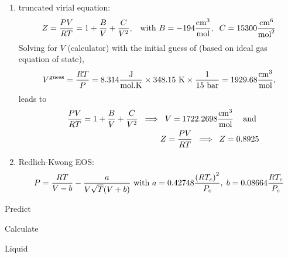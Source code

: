 \begin{probsol}
     \begin{enumerate}[1.]
%
        \item truncated virial equation:
            \begin{displaymath}
               Z =  \displaystyle\frac{PV}{RT}=1+\displaystyle\frac{B}{V}+\displaystyle\frac{C}{V^{2}}, \;\;\;\text{with } B=-194\displaystyle\frac{\text{cm}^{3}}{\text{mol}},\;\;C=15300 \displaystyle\frac{\text{cm}^{6}}{\text{mol}^{2}}
            \end{displaymath}
            Solving for $V$ (calculator) with the initial guess of (based on ideal gas equation of state),
            \begin{displaymath}
               V^{\text{guess}} = \displaystyle\frac{RT}{P} = 8.314 \displaystyle\frac{\text{J}}{\text{mol.K}} \times 348.15\text{ K} \times \displaystyle\frac{1}{15\text{ bar}} = 1929.68 \displaystyle\frac{\text{cm}^{3}}{\text{mol}},
            \end{displaymath}
            leads to
            \begin{eqnarray}
               &&\displaystyle\frac{PV}{RT}=1+\displaystyle\frac{B}{V}+\displaystyle\frac{C}{V^{2}} \;\;\Longrightarrow \;\; V = 1722.2698 \displaystyle\frac{\text{cm}^{3}}{\text{mol}}\;\;\;\text{ and } \nonumber \\
               && Z =  \displaystyle\frac{PV}{RT} \;\;\Longrightarrow \;\; Z = 0.8925 \nonumber
            \end{eqnarray}
%
        \item Redlich-Kwong EOS:
            \begin{displaymath}
               P = \displaystyle\frac{RT}{V-b} - \displaystyle\frac{a}{V\sqrt{T}(V+b)}\text{ with } a = 0.42748\displaystyle\frac{\left(R T_{c}\right)^{2}}{P_{c}},\; b = 0.08664\displaystyle\frac{R T_{c}}{P_{c}}
            \end{displaymath}
%
     \end{enumerate}


  \end{probsol}
%
  \begin{probsol}\label{Chapter:VolumetricPropertiesPureSubstances:Problem:02:solution}
     Predict 
  \end{probsol}
%
  \begin{probsol}\label{Chapter:VolumetricPropertiesPureSubstances:Problem:03:solution}
     Calculate
  \end{probsol}
%
  \begin{probsol}\label{Chapter:VolumetricPropertiesPureSubstances:Problem:04:solution} 
     Liquid 
  \end{probsol}
%
